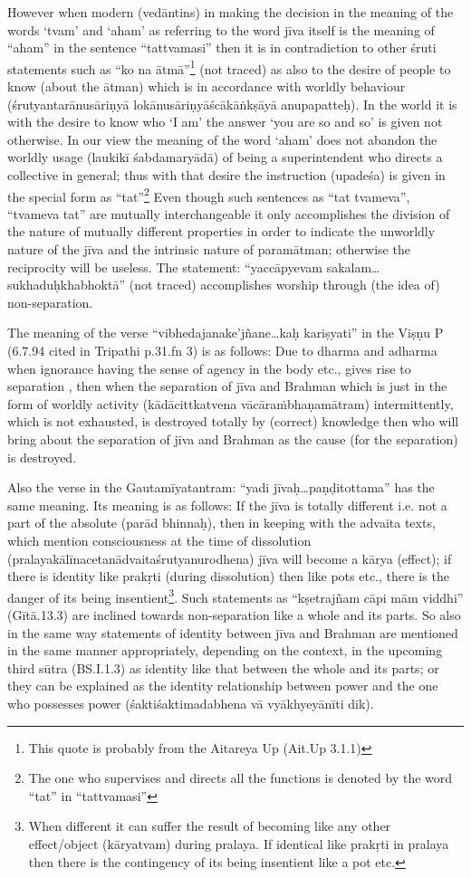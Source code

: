 However when modern (vedāntins) in making the decision in the meaning of the words ‘tvam’ and ‘aham’ as referring to    the word jīva itself is the meaning of “aham” in the sentence “tattvamasi” then it is in contradiction to other śruti statements such as “ko na ātmā”\footnote{This quote is probably from the Aitareya Up (Ait.Up 3.1.1)} (not traced) as also to the desire of people to know (about the ātman)  which is in accordance with worldly behaviour (śrutyantarānusāriṇyā lokānusāriṇyāścākāṅkṣāyā anupapatteḥ). In the world it is with the desire to know who ‘I am’ the answer ‘you are so and so’ is given not otherwise. In our view the meaning of the word ‘aham’ does not abandon the worldly usage (laukikī śabdamaryādā) of being a superintendent who directs a collective in general; thus with that desire the instruction (upadeśa) is given in the special form as “tat”\footnote{The one who supervises and directs all the functions is denoted by the word “tat” in “tattvamasi”} Even though such sentences as “tat tvameva”, “tvameva tat” are mutually interchangeable it only accomplishes the division of the nature of mutually different properties in order to indicate the unworldly nature of the jīva and the intrinsic nature of paramātman; otherwise the reciprocity will be useless. The statement: “yaccāpyevam sakalam…sukhaduḥkhabhoktā” (not traced) accomplishes worship through (the idea of) non-separation.

The meaning of the verse “vibhedajanake’jñane…kaḥ kariṣyati” in the Viṣṇu P  (6.7.94 cited in Tripathi p.31.fn 3) is as follows: Due to dharma and adharma when ignorance having the sense of agency in the body etc., gives rise to separation , then when the separation of jīva and Brahman which is just in the form of worldly activity (kādācittkatvena vācāraṁbhaṇamātram) intermittently, which is not exhausted, is destroyed totally by (correct) knowledge then who will bring about the separation of jīva and Brahman as the cause (for the separation) is destroyed.

Also the verse in the Gautamīyatantram: “yadi jīvaḥ…paṇḍitottama” has the same meaning. Its meaning is as follows: If the jīva is totally different i.e. not a part of the absolute (parād bhinnaḥ), then in keeping with the advaita texts, which mention consciousness at the time of dissolution (pralayakālīnacetanādvaitaśrutyanurodhena) jīva will become a kārya (effect); if there is identity like prakṛti (during dissolution) then like pots etc., there is the danger of its being insentient\footnote{When different it can suffer the result of becoming like any other effect/object (kāryatvam) during pralaya. If identical like prakṛti in pralaya then there is the contingency of its being insentient like a pot etc.}. Such statements as “kṣetrajñam cāpi mām viddhi” (Gītā.13.3) are inclined towards non-separation like a whole and its parts. So also in the same way statements of identity between jīva and Brahman are mentioned in the same manner appropriately, depending on the context, in the upcoming third sūtra (BS.I.1.3) as identity like that between the whole and its parts; or they can be explained as the identity relationship between power and the one who possesses power (śaktiśaktimadabhena vā vyākhyeyānīti dik). 

